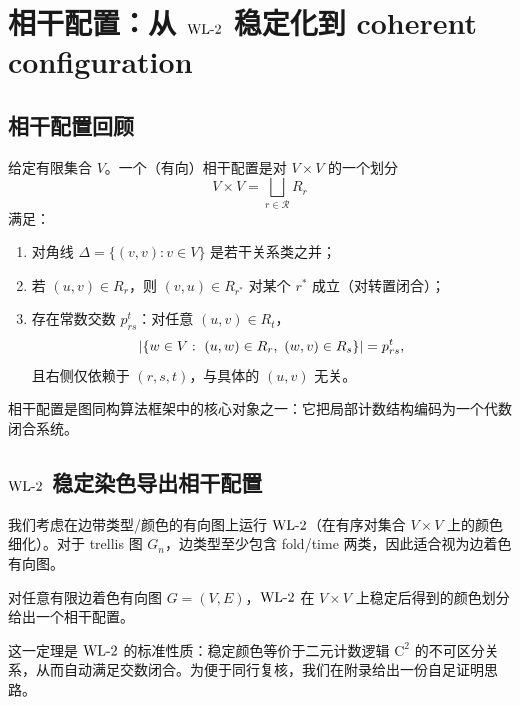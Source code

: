 
\section{相干配置：从 $\mathrm{WL}\text{-}2$ 稳定化到 coherent configuration}

\subsection{相干配置回顾}

\begin{definition}[相干配置]\label{def:coherent_configuration}
给定有限集合 $V$。一个（有向）相干配置是对 $V\times V$ 的一个划分
$$
V\times V=\bigsqcup_{r\in\mathcal{R}} R_r
$$
满足：
\begin{enumerate}
  \item 对角线 $\Delta=\{(v,v):v\in V\}$ 是若干关系类之并；
  \item 若 $(u,v)\in R_r$，则 $(v,u)\in R_{r^\ast}$ 对某个 $r^\ast$ 成立（对转置闭合）；
  \item 存在常数交数 $p_{rs}^t$：对任意 $(u,v)\in R_t$，
  $$
  \left\lvert \{w\in V:\ (u,w)\in R_r,\ (w,v)\in R_s\}\right\rvert=p_{rs}^t,
  $$
  且右侧仅依赖于 $(r,s,t)$，与具体的 $(u,v)$ 无关。
\end{enumerate}
\end{definition}

相干配置是图同构算法框架中的核心对象之一：它把局部计数结构编码为一个代数闭合系统。

\subsection{$\mathrm{WL}\text{-}2$ 稳定染色导出相干配置}

我们考虑在边带类型/颜色的有向图上运行 $\mathrm{WL}\text{-}2$（在有序对集合 $V\times V$ 上的颜色细化）。对于 trellis 图 $G_n$，边类型至少包含 fold/time 两类，因此适合视为边着色有向图。

\begin{theorem}\label{thm:wl2_to_cc}
对任意有限边着色有向图 $G=(V,E)$，$\mathrm{WL}\text{-}2$ 在 $V\times V$ 上稳定后得到的颜色划分给出一个相干配置。
\end{theorem}

\begin{remark}
这一定理是 $\mathrm{WL}\text{-}2$ 的标准性质：稳定颜色等价于二元计数逻辑 $\mathrm{C}^2$ 的不可区分关系，从而自动满足交数闭合。为便于同行复核，我们在附录给出一份自足证明思路。
\end{remark}

